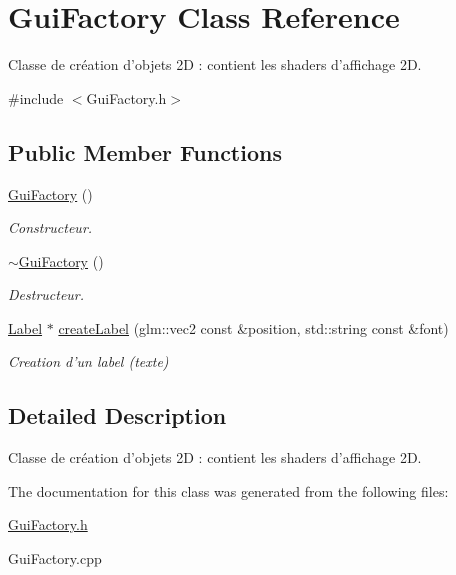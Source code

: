 \hypertarget{classGuiFactory}{\section{Gui\-Factory Class Reference}
\label{classGuiFactory}
}


Classe de création d'objets 2\-D \-: contient les shaders d'affichage 2\-D.  




{\ttfamily \#include $<$Gui\-Factory.\-h$>$}

\subsection*{Public Member Functions}
\begin{DoxyCompactItemize}
\item 
\hypertarget{classGuiFactory_a3d7afcd225a44171f4107d67fdfda2c5}{\hyperlink{classGuiFactory_a3d7afcd225a44171f4107d67fdfda2c5}{Gui\-Factory} ()}\label{classGuiFactory_a3d7afcd225a44171f4107d67fdfda2c5}

\begin{DoxyCompactList}\small\item\em Constructeur. \end{DoxyCompactList}\item 
\hypertarget{classGuiFactory_a77f5f87312431f37b1c279db09b00a46}{\hyperlink{classGuiFactory_a77f5f87312431f37b1c279db09b00a46}{$\sim$\-Gui\-Factory} ()}\label{classGuiFactory_a77f5f87312431f37b1c279db09b00a46}

\begin{DoxyCompactList}\small\item\em Destructeur. \end{DoxyCompactList}\item 
\hypertarget{classGuiFactory_ae37a3ad8191728d30ab050aec876787e}{\hyperlink{classLabel}{Label} $\ast$ \hyperlink{classGuiFactory_ae37a3ad8191728d30ab050aec876787e}{create\-Label} (glm\-::vec2 const \&position, std\-::string const \&font)}\label{classGuiFactory_ae37a3ad8191728d30ab050aec876787e}

\begin{DoxyCompactList}\small\item\em Creation d'un label (texte) \end{DoxyCompactList}\end{DoxyCompactItemize}


\subsection{Detailed Description}
Classe de création d'objets 2\-D \-: contient les shaders d'affichage 2\-D. 

The documentation for this class was generated from the following files\-:\begin{DoxyCompactItemize}
\item 
\hyperlink{GuiFactory_8h}{Gui\-Factory.\-h}\item 
Gui\-Factory.\-cpp\end{DoxyCompactItemize}
